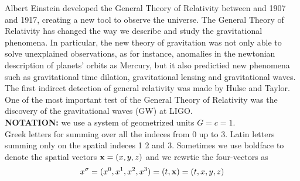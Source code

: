 Albert Einstein developed the General Theory of Relativity between and 1907 and 1917, creating a new tool to observe the universe. 
The General Theory of Relativity has changed the way we describe and study the gravitational phenomena. 
In particular, the new theory of gravitation was not only able to solve unexplained observations, as for instance, anomalies in the newtonian description of planets' orbits as Mercury, but it also predictied new  phenomena such as gravitational time dilation, gravitational lensing and gravitational waves.
The first indirect detection of general relativity was made by Hulse and Taylor.
One of the most important test of the General Theory of Relativity was the discovery of the gravitational waves (GW) at LIGO.\\





\textbf{NOTATION:} we use a system of geometrized units $G=c=1$.\\
Greek letters for summing over all the indeces from 0 up to 3.
Latin letters summing only on the spatial indeces 1 2 and 3.
Sometimes we use boldface to denote the spatial vectors $\vb{x} =(x,y,z)$ and we rewrtie the four-vectors as 
\[
x^{\sigma} = (x^{0},x^{1}, x^{2},x^{3}) = (t,\vb{x}) = (t,x,y,z)
\]
